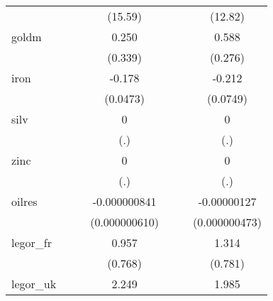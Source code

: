 {\begin{tabular}{l*{6}{c}}
            &                     &                     &     (15.59)         &                     &                     &     (12.82)         \\
[1em]
goldm       &                     &                     &       0.250         &                     &                     &       0.588\sym{*}  \\
            &                     &                     &     (0.339)         &                     &                     &     (0.276)         \\
[1em]
iron        &                     &                     &      -0.178\sym{**} &                     &                     &      -0.212\sym{**} \\
            &                     &                     &    (0.0473)         &                     &                     &    (0.0749)         \\
[1em]
silv        &                     &                     &           0         &                     &                     &           0         \\
            &                     &                     &         (.)         &                     &                     &         (.)         \\
[1em]
zinc        &                     &                     &           0         &                     &                     &           0         \\
            &                     &                     &         (.)         &                     &                     &         (.)         \\
[1em]
oilres      &                     &                     &-0.000000841         &                     &                     & -0.00000127\sym{*}  \\
            &                     &                     &(0.000000610)         &                     &                     &(0.000000473)         \\
[1em]
legor\_fr    &                     &                     &       0.957         &                     &                     &       1.314         \\
            &                     &                     &     (0.768)         &                     &                     &     (0.781)         \\
[1em]
legor\_uk    &                     &                     &       2.249\sym{**} &                     &                     &       1.985\sym{**} \\

\end{tabular}}
